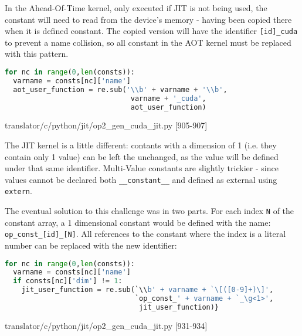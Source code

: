 In the Ahead-Of-Time kernel, only executed if JIT is not being used, the constant will need to read from the device's memory - having been copied there when it is defined constant. The copied version will have the identifier \verb|[id]_cuda| to prevent a name collision, so all constant in the AOT kernel must be replaced with this pattern.
\begin{lstlisting}[backgroundcolor = \color{lightgray!20}, language=Python]
for nc in range(0,len(consts)):
  varname = consts[nc]['name']
  aot_user_function = re.sub('\\b' + varname + '\\b',
                              varname + '_cuda',
                              aot_user_function)
\end{lstlisting}
\vspace{-1em}
\hspace*{\fill}\footnotesize{translator/c/python/jit/op2\_gen\_cuda\_jit.py [905-907]}

The JIT kernel is a little different: contants with a dimension of 1 (i.e. they contain only 1 value) can be left the unchanged, as the value will be defined under that same identifier. Multi-Value constants are slightly trickier - since values cannot be declared both \verb|__constant__| and defined as external using \verb|extern|\cite[p126]{guide}.
\par
The eventual solution to this challenge was in two parts. For each index \verb|N| of the constant array, a 1 dimensional constant would be defined with the name: \verb|op_const_[id]_[N]|. All references to the constant where the index is a literal number can be replaced with the new identifier:
\begin{lstlisting}[backgroundcolor = \color{lightgray!20}, language=Python]
for nc in range(0,len(consts)):
  varname = consts[nc]['name']
  if consts[nc]['dim'] != 1:
    jit_user_function = re.sub(`\\b' + varname + `\[([0-9]+)\]',
                               `op_const_' + varname + `_\g<1>',
                                jit_user_function)}
\end{lstlisting}
\vspace{-1em}
\hspace*{\fill}\footnotesize{translator/c/python/jit/op2\_gen\_cuda\_jit.py [931-934]}


